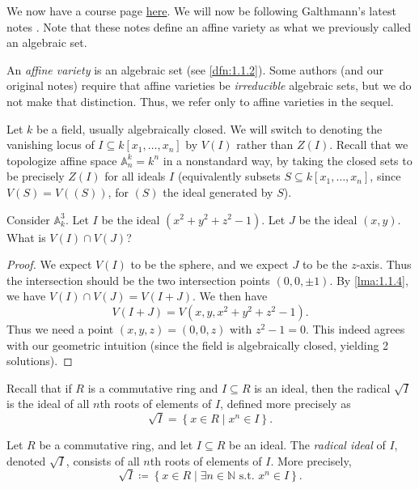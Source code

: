 
We now have a course page \href{https://math.bu.edu/people/szczesny/Teaching/745F26/745.html}{here}. We will now be following Galthmann's latest notes \cite{gathmann2021}. Note that these notes define an affine variety as what we previously called an algebraic set.

\begin{definition}\label{dfn:1-1-6}
	An \emph{affine variety} is an algebraic set (see \cref{dfn:1.1.2}). Some authors (and our original notes) require that affine varieties be \emph{irreducible} algebraic sets, but we do not make that distinction. Thus, we refer only to affine varieties in the sequel.
\end{definition}


Let $k$ be a field, usually algebraically closed. We will switch to denoting the vanishing locus of $I\subseteq k[x_1, \ldots ,x_n]$ by $V(I)$ rather than $Z(I)$. Recall that we topologize affine space $\mathbb{A} _n^k = k^n$ in a nonstandard way, by taking the closed sets to be precisely $Z(I)$ for all ideals $I$ (equivalently subsets $S\subseteq k[x_1, \ldots ,x_n]$, since $V(S)=V((S))$, for $(S)$ the ideal generated by $S$).

\begin{exercise}\label{ex:1-1-7}
	Consider $\mathbb{A} ^3_k$. Let $I$ be the ideal $(x^2+y^2+z^2-1)$. Let $J$ be the ideal $(x,y)$. What is $V(I)\cap V(J)$?
\end{exercise}
\begin{proof}
	We expect $V(I)$ to be the sphere, and we expect $J$ to be the $z$-axis. Thus the intersection should be the two intersection points $(0,0,\pm1)$. By \cref{lma:1.1.4}, we have $V(I)\cap V(J)=V(I+J)$. We then have
	\[
		V(I+J)=V(x,y,x^2+y^2+z^2-1)
	.\]
	Thus we need a point $(x,y,z) = (0,0,z)$ with $z^2-1=0$. This indeed agrees with our geometric intuition (since the field is algebraically closed, yielding 2 solutions).
\end{proof}

Recall that if $R$ is a commutative ring and $I\subseteq R$ is an ideal, then the radical $\sqrt{I} $ is the ideal of all $n$th roots of elements of $I$, defined more precisely as
\[
	\sqrt{I} =\left\{ x\in R \mid x^n\in I \right\} 
.\]
\begin{definition}[Radical]\label{dfn:radical-ideal}
	Let $R$ be a commutative ring, and let $I\subseteq R$ be an ideal. The \emph{radical ideal} of $I$, denoted $\sqrt{I} $, consists of all $n$th roots of elements of $I$. More precisely,
	\[
		\sqrt{I} \coloneqq \left\{ x\in R\mid \exists n\in\mathbb{N} \text{ s.t. } x^n\in I  \right\} 
	.\]
\end{definition}

